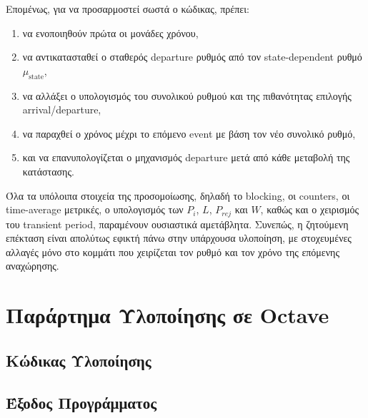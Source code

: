 \documentclass{article}
\begin{document}
Επομένως, για να προσαρμοστεί σωστά ο κώδικας, πρέπει:

\begin{enumerate}[label=\arabic*.]
    \item να ενοποιηθούν πρώτα οι μονάδες χρόνου,
    \item να αντικατασταθεί ο σταθερός departure ρυθμός από τον state-dependent ρυθμό $\mu_{\text{state}}$,
    \item να αλλάξει ο υπολογισμός του συνολικού ρυθμού και της πιθανότητας επιλογής \\ arrival/departure,
    \item να παραχθεί ο χρόνος μέχρι το επόμενο event με βάση τον νέο συνολικό ρυθμό,
    \item και να επανυπολογίζεται ο μηχανισμός departure μετά από κάθε μεταβολή της κατάστασης.
\end{enumerate}

Όλα τα υπόλοιπα στοιχεία της προσομοίωσης, δηλαδή το blocking, οι counters, οι time-average μετρικές, ο υπολογισμός των $P_i$, $L$, $P_{rej}$ και $W$, καθώς και ο χειρισμός του transient period, παραμένουν ουσιαστικά αμετάβλητα. Συνεπώς, η ζητούμενη επέκταση είναι απολύτως εφικτή πάνω στην υπάρχουσα υλοποίηση, με στοχευμένες αλλαγές μόνο στο κομμάτι που χειρίζεται τον ρυθμό και τον χρόνο της επόμενης αναχώρησης.

\newpage
\section{Παράρτημα Υλοποίησης σε Octave}

\subsection{Κώδικας Υλοποίησης}


\newpage
\subsection{Έξοδος Προγράμματος}

\end{document}
